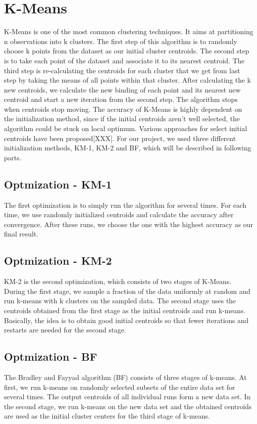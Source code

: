 \documentclass{acm_proc_article-sp}
\begin{document}
\section{K-Means}
K-Means is one of the most common clustering techniques. It aims at partitioning n observations into k clusters. The first step of this algorithm is to randomly choose k points from the dataset as our initial cluster centroids. The second step is to take each point of the dataset and associate it to its nearest centroid. The third step is re-calculating the centroids for each cluster that we get from last step by taking the means of all points within that cluster. After calculating the k new centroids, we calculate the new binding of each point and its nearest new centroid and start a new iteration from the second step. The algorithm stops when centroids stop moving.
The accuracy of K-Means is highly dependent on the initialization method, since if the initial centroids aren’t well selected, the algorithm could be stuck on local optimum. Various approaches for select initial centroids have been proposed[XXX]. For our project, we used three different initialization methods, KM-1, KM-2 and BF, which will be described in following parts.

\subsection{Optmization - KM-1}
The first optimization is to simply run the algorithm for several times. For each time, we use randomly initialized centroids and calculate the accuracy after convergence. After these runs, we choose the one with the highest accuracy as our final result.
\subsection{Optmization - KM-2}
KM-2 is the second optimization, which consists of two stages of K-Means. During the first stage, we sample a fraction of the data uniformly at random and run k-means with k clusters on the sampled data. The second stage uses the centroids obtained from the first stage as the initial centroids and run k-means. Basically, the idea is to obtain good initial centroids so that fewer iterations and restarts are needed for the second stage.
\subsection{Optmization - BF}
The Bradley and Fayyad algorithm (BF) consists of three stages of k-means. At first, we run k-means on randomly selected subsets of the entire data set for several times. The output centroids of all individual runs form a new data set. In the second stage, we run k-means on the new data set and the obtained centroids are used as the initial cluster centers for the third stage of k-means.
\end{document}
